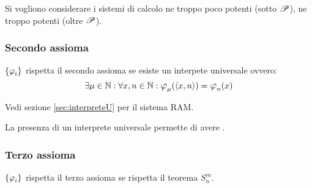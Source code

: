 Si vogliono considerare i sistemi di calcolo ne troppo poco potenti (sotto $\mathscr{P}$),
ne troppo potenti (oltre $\mathscr{P}$).

\subsubsection*{Secondo assioma}
$\sistProg$ rispetta il secondo assioma se esiste un interpete universale ovvero:
$$ \exists\mu\in\N : \forall x,n\in\N: \semanticaRAM_\mu(\cantor{x,n})=
\semanticaRAM_n(x) $$

Vedi sezione \ref{sec:interpreteU} per il sistema RAM.

La presenza di un interprete universale permette di avere .

\subsubsection*{Terzo assioma}
$\sistProg$ rispetta il terzo assioma se rispetta il teorema $S_n^m$.

